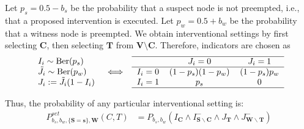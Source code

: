 \documentclass[anon,12pt]{clear2025} %
\begin{document}
\begin{definition}
    Let $p_s = 0.5 - b_s$ be the probability that a suspect node is not preempted, i.e., that a proposed intervention is executed. Let $p_w = 0.5 + b_w$ be the probability that a witness node is preempted. We obtain interventional settings by first selecting $\mathbf{C}$, then selecting $\mathbf{T}$ from $\mathbf{V} \setminus \mathbf{C}$. Therefore, indicators are chosen as 
    \[
    \begin{array}{ccc}
    \begin{array}{l}
    I_i \sim \mathrm{Ber}(p_s) \\
    \tilde{J}_i \sim \mathrm{Ber}(p_w) \\
    J_i := \tilde{J}_i (1 - I_i)
    \end{array}
    & \Longleftrightarrow &
    \begin{tabular}{lcc}
    \hline
     & $J_i = 0$ & $J_i = 1$ \\
    \hline
    $I_i = 0$ & $(1 - p_s)(1 - p_w)$ & $(1 - p_s)p_w$ \\
    $I_i = 1$ & $p_s$ & $0$ \\
    \hline
    \end{tabular}
    \end{array}
    \]

    \noindent Thus, the probability of any particular interventional setting is:
\begin{align}\label{eq:psetawct}
P^{\mathit{set}}_{b_s,b_w, \{\mathbf{S}=\mathbf{s}\}, \mathbf{W}}(C,T) & = P_{b_s, b_w}\left(I_{\mathbf{C}} \wedge I^-_{\mathbf{S} \backslash \mathbf{C}}  \wedge  J_\mathbf{T}  \wedge J^-_{\mathbf{W} \backslash \mathbf{T}} \right)   %
\end{align}
\end{definition}
\noindent 



        
\end{document}
